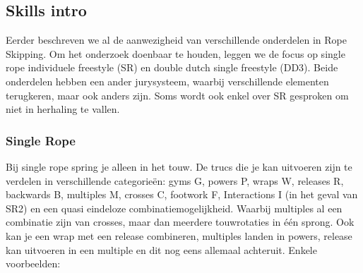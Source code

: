 \subsection{Skills intro}
\label{subsec:basisskills}

    Eerder beschreven we al de aanwezigheid van verschillende onderdelen in Rope Skipping. Om het onderzoek doenbaar te houden, leggen we de focus op single rope individuele freestyle (SR) en double dutch single freestyle (DD3). Beide onderdelen hebben een ander jurysysteem, waarbij verschillende elementen terugkeren, maar ook anders zijn. Soms wordt ook enkel over SR gesproken om niet in herhaling te vallen.

\subsubsection{Single Rope}

Bij single rope spring je alleen in het touw. De trucs die je kan uitvoeren zijn te verdelen in verschillende categorieën: gyms G, powers P, wraps W, releases R, backwards B, multiples M, crosses C, footwork F, Interactions I (in het geval van SR2) en een quasi eindeloze combinatiemogelijkheid. Waarbij multiples al een combinatie zijn van crosses, maar dan meerdere touwrotaties in één sprong. Ook kan je een wrap met een release combineren, multiples landen in powers, release kan uitvoeren in een multiple en dit nog eens allemaal achteruit.
Enkele voorbeelden:


